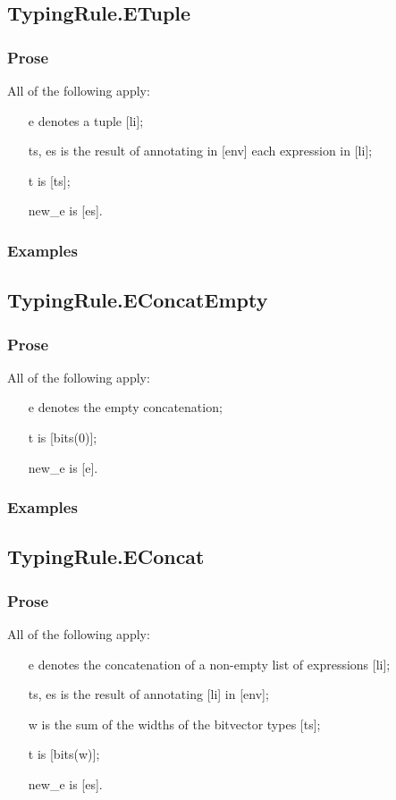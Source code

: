 \documentclass{book}
\begin{document}
\subsection{TypingRule.ETuple}

  \subsubsection{Prose}
  All of the following apply:
  \begin{itemize}
  \item  [e] denotes a tuple [li];
  \item  [ts, es] is the result of annotating in [env] each expression in [li];
  \item  [t] is [ts];
  \item  [new\_e] is [es].
  \end{itemize}

  \subsubsection{Examples}

\subsection{TypingRule.EConcatEmpty}

  \subsubsection{Prose}
  All of the following apply:
  \begin{itemize}
  \item  [e] denotes the empty concatenation;
  \item  [t] is [bits(0)];
  \item  [new\_e] is [e].
  \end{itemize}

  \subsubsection{Examples}

\subsection{TypingRule.EConcat}

  \subsubsection{Prose}
  All of the following apply:
  \begin{itemize}
  \item  [e] denotes the concatenation of a non-empty list of expressions [li];
  \item  [ts, es] is the result of annotating [li] in [env];
  \item  [w] is the sum of the widths of the bitvector types [ts];
  \item  [t] is [bits(w)];
  \item  [new\_e] is [es].
  \end{itemize}
\end{document}

